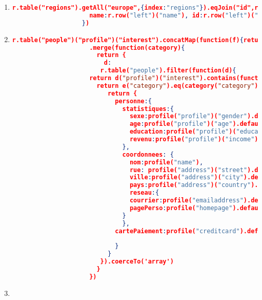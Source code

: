 \begin{enumerate}[label=Q\arabic*]
	
    \item \label{rethink-q-9}%
	\begin{lstlisting}[language=JSON, basicstyle=\scriptsize]
	   r.table("regions").getAll("europe",{index:"regions"}).eqJoin("id",r.table("closed_auctions"),{index:"closed_itemref_item"}).map({
	                 name:r.row("left")("name"), id:r.row("left")("id"),
	               })
	\end{lstlisting}
	
	
    \item \label{rethink-q-10}%
    
	\begin{lstlisting}[language=JSON, basicstyle=\scriptsize]
	   r.table("people")("profile")("interest").concatMap(function(f){return f}).distinct()
	                 .merge(function(category){
	                   return {
	                     d:
	                    r.table("people").filter(function(d){
	                 return d("profile")("interest").contains(function(e){
	                   return e("category").eq(category("category"))})}).map(function(profile){
	                      return {
	                        personne:{
	                          statistiques:{
	                            sexe:profile("profile")("gender").default(""),
	                            age:profile("profile")("age").default(""),
	                            education:profile("profile")("education").default(""),
	                            revenu:profile("profile")("income").default("")
	                          },
	                          coordonnees: {
	                            nom:profile("name"),
	                            rue: profile("address")("street").default(""),
	                            ville:profile("address")("city").default(""),
	                            pays:profile("address")("country").default(""),
	                            reseau:{
	                            courrier:profile("emailaddress").default(""),
	                            pagePerso:profile("homepage").default("")
	                          }
	                          },
	                        cartePaiement:profile("creditcard").default("")
	   
	                        }
	                      }
	                    }).coerceTo('array')
	                   }
	                 })
	\end{lstlisting}
	
	
    \item \label{rethink-q-11}%
    

\end{enumerate}
